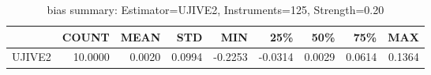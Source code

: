 \begin{table}[ht]
\centering
\caption{bias summary: Estimator=UJIVE2, Instruments=125, Strength=0.20}
\begin{tabular}{lrrrrrrrr}
\toprule
 & COUNT & MEAN & STD & MIN & 25\% & 50\% & 75\% & MAX \\
\midrule
UJIVE2 & 10.0000 & 0.0020 & 0.0994 & -0.2253 & -0.0314 & 0.0029 & 0.0614 & 0.1364 \\
\bottomrule
\end{tabular}
\end{table}
